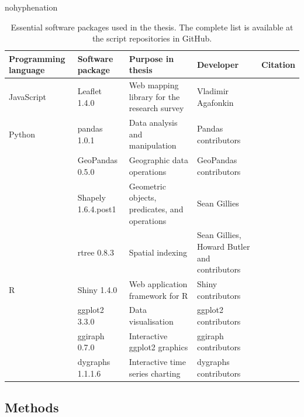 \begin{hyphenrules}{nohyphenation}
    \begin{table}[H]
        \centering
        \caption{Essential software packages used in the thesis. The complete list is available at the script repositories in GitHub.} 
        \label{tab:usedsoft}
        \def\arraystretch{1.2}
        \setlength\tabcolsep{1.2ex}
        \begin{tabular}{ @{} >{\raggedright\arraybackslash}p{2.5cm} >{\raggedright\arraybackslash}p{2.5cm} >{\raggedright\arraybackslash}p{3.5cm} >{\raggedright\arraybackslash}p{3.5cm} >{\raggedleft\arraybackslash}p{3cm} @{} }
            \toprule
            Programming language & Software package & Purpose in thesis & Developer & Citation \\
            \midrule
            JavaScript & Leaflet 1.4.0 & Web mapping library for the research survey & Vladimir Agafonkin & \cite{Agafonkin2019} \\
            Python & pandas 1.0.1 & Data analysis and manipulation & Pandas contributors & \cite{McKinney2011a} \\
                & GeoPandas 0.5.0 & Geographic data operations & GeoPandas contributors & \cite{GeoPandasDevelopers2019} \\
                & Shapely 1.6.4.post1 & Geometric objects, predicates, and operations & Sean Gillies & \cite{Gillies2019} \\
                & rtree 0.8.3 & Spatial indexing & Sean Gillies, Howard Butler and contributors & \cite{Gillies2014} \\
            R & Shiny 1.4.0 & Web application framework for R & Shiny contributors & \cite{Chang2019} \\
                & ggplot2 3.3.0 & Data visualisation & ggplot2 contributors & \cite{Wickham2016} \\
                & ggiraph 0.7.0 & Interactive ggplot2 graphics & ggiraph contributors & \cite{Gohel2019} \\
                & dygraphs 1.1.1.6 & Interactive time series charting & dygraphs contributors & \cite{Vanderkam2018} \\
            \bottomrule
        \end{tabular}
    \end{table} 
\end{hyphenrules}

\subsection{Methods}
\justify

